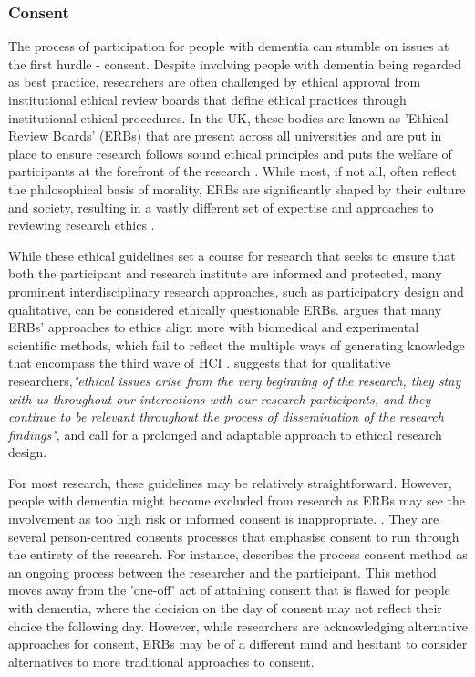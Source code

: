 \subsubsection{Consent}
The process of participation for people with dementia can stumble on issues at the first hurdle - consent. Despite involving people with dementia being regarded as best practice, researchers are often challenged by ethical approval from institutional ethical review boards that define ethical practices through institutional ethical procedures. In the UK, these bodies are known as 'Ethical Review Boards' (ERBs) that are present across all universities and are put in place to ensure research follows sound ethical principles and puts the welfare of participants at the forefront of the research \citep{pachana_can_2014}. While most, if not all, often reflect the philosophical basis of morality, ERBs are significantly shaped by their culture and society, resulting in a vastly different set of expertise and approaches to reviewing research ethics \citep{flicker_ethical_2007}.

While these ethical guidelines set a course for research that seeks to ensure that both the participant and research institute are informed and protected, many prominent interdisciplinary research approaches, such as participatory design and qualitative, can be considered ethically questionable ERBs. \cite{bell_censorship_2014} argues that many ERBs' approaches to ethics align more with biomedical and experimental scientific methods, which fail to reflect the multiple ways of generating knowledge that encompass the third wave of HCI \citep{bodker_when_2006,lazar_critical_2017}. \cite{carla_introducing_2013} suggests that for qualitative researchers,\textit{"ethical issues arise from the very beginning of the research, they stay with us throughout our interactions with our research participants, and they continue to be relevant throughout the process of dissemination of the research findings"}, and call for a prolonged and adaptable approach to ethical research design. 

For most research, these guidelines may be relatively straightforward. However, people with dementia might become excluded from research as ERBs may see the involvement as too high risk or informed consent is inappropriate. \citep{dewing2004including}. They are several person-centred consents processes that emphasise consent to run through the entirety of the research. For instance, \cite{dewing_participatory_2007} describes the process consent method as an ongoing process between the researcher and the participant. This method moves away from the 'one-off' act of attaining consent that is flawed for people with dementia, where the decision on the day of consent may not reflect their choice the following day. However, while researchers are acknowledging alternative approaches for consent, ERBs may be of a different mind and hesitant to consider alternatives to more traditional approaches to consent.


